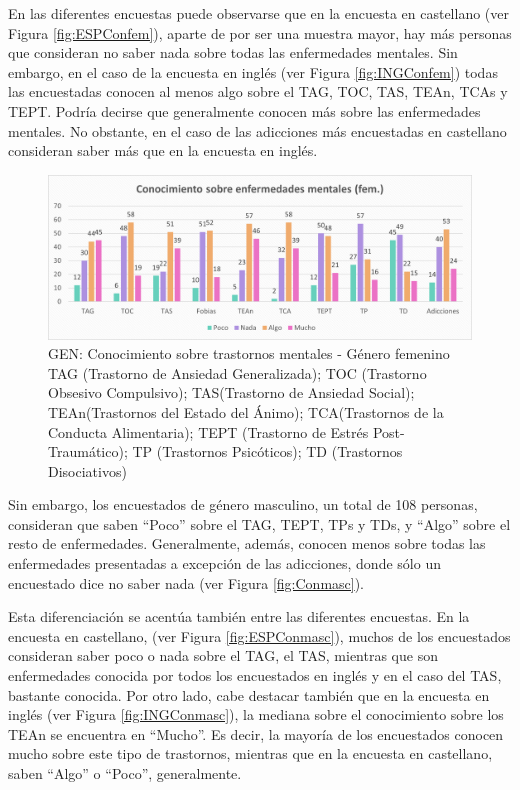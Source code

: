 \documentclass[12pt, a4paper,twoside,titlepage]{book}
\begin{document}
En las diferentes encuestas puede observarse que en la encuesta en castellano (ver Figura \ref{fig:ESPConfem}), aparte de por ser una muestra mayor, hay más personas que consideran no saber nada sobre todas las enfermedades mentales. Sin embargo, en el caso de la encuesta en inglés (ver Figura \ref{fig:INGConfem}) todas las encuestadas conocen al menos algo sobre el TAG, TOC, TAS, TEAn, TCAs y TEPT. Podría decirse que generalmente conocen más sobre las enfermedades mentales. No obstante, en el caso de las adicciones más encuestadas en castellano consideran saber más que en la encuesta en inglés. 


\begin{figure}
\centering
 \includegraphics[width=1\linewidth]{ANEXO Gen/11AnexGENCongfem}
 \caption{GEN: Conocimiento sobre trastornos mentales - Género femenino\\
 TAG (Trastorno de Ansiedad Generalizada); TOC (Trastorno Obsesivo Compulsivo); TAS(Trastorno de Ansiedad Social); TEAn(Trastornos del Estado del Ánimo); TCA(Trastornos de la Conducta Alimentaria); TEPT (Trastorno de Estrés Post-Traumático); TP (Trastornos Psicóticos); TD (Trastornos Disociativos) }
 \label{fig:Confem}
 \end{figure}



Sin embargo, los encuestados de género masculino, un total de 108 personas, consideran que saben “Poco” sobre el TAG, TEPT, TPs y TDs, y “Algo” sobre el resto de enfermedades. Generalmente, además, conocen menos sobre todas las enfermedades presentadas a excepción de las adicciones, donde sólo un encuestado dice no saber nada (ver Figura \ref{fig:Conmasc}). 

Esta diferenciación se acentúa también entre las diferentes encuestas. En la encuesta en castellano, (ver Figura \ref{fig:ESPConmasc}),  muchos de los encuestados consideran saber poco o nada sobre el TAG, el TAS, mientras que son enfermedades conocida por todos los encuestados en inglés y en el caso del TAS, bastante conocida. Por otro lado, cabe destacar también que en la encuesta en inglés (ver Figura \ref{fig:INGConmasc}), la mediana sobre el conocimiento sobre los TEAn se encuentra en “Mucho”. Es decir, la mayoría de los encuestados conocen mucho sobre este tipo de trastornos, mientras que en la encuesta en castellano, saben “Algo” o “Poco”, generalmente. 
\end{document}
